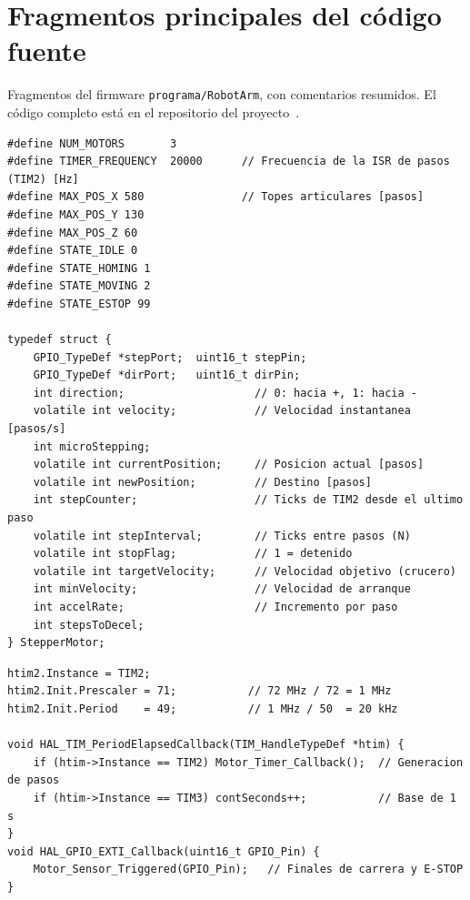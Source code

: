 \section{Fragmentos principales del código fuente}\label{anx:codigo}
Fragmentos del firmware \texttt{programa/RobotArm}, con comentarios resumidos. El código
completo está en el repositorio del proyecto~\cite{repo}.

\begin{lstlisting}[caption={Estructura de motor y constantes (\texttt{robot\_defines.h}).}]
#define NUM_MOTORS       3
#define TIMER_FREQUENCY  20000      // Frecuencia de la ISR de pasos (TIM2) [Hz]
#define MAX_POS_X 580               // Topes articulares [pasos]
#define MAX_POS_Y 130
#define MAX_POS_Z 60
#define STATE_IDLE 0
#define STATE_HOMING 1
#define STATE_MOVING 2
#define STATE_ESTOP 99

typedef struct {
    GPIO_TypeDef *stepPort;  uint16_t stepPin;
    GPIO_TypeDef *dirPort;   uint16_t dirPin;
    int direction;                    // 0: hacia +, 1: hacia -
    volatile int velocity;            // Velocidad instantanea [pasos/s]
    int microStepping;
    volatile int currentPosition;     // Posicion actual [pasos]
    volatile int newPosition;         // Destino [pasos]
    int stepCounter;                  // Ticks de TIM2 desde el ultimo paso
    volatile int stepInterval;        // Ticks entre pasos (N)
    volatile int stopFlag;            // 1 = detenido
    volatile int targetVelocity;      // Velocidad objetivo (crucero)
    int minVelocity;                  // Velocidad de arranque
    int accelRate;                    // Incremento por paso
    int stepsToDecel;
} StepperMotor;
\end{lstlisting}

\begin{lstlisting}[caption={Configuración de TIM2 (\texttt{tim.c}) y \emph{callbacks} de interrupción (\texttt{main.c}).}]
htim2.Instance = TIM2;
htim2.Init.Prescaler = 71;           // 72 MHz / 72 = 1 MHz
htim2.Init.Period    = 49;           // 1 MHz / 50  = 20 kHz

void HAL_TIM_PeriodElapsedCallback(TIM_HandleTypeDef *htim) {
    if (htim->Instance == TIM2) Motor_Timer_Callback();  // Generacion de pasos
    if (htim->Instance == TIM3) contSeconds++;           // Base de 1 s
}
void HAL_GPIO_EXTI_Callback(uint16_t GPIO_Pin) {
    Motor_Sensor_Triggered(GPIO_Pin);   // Finales de carrera y E-STOP
}
\end{lstlisting}

